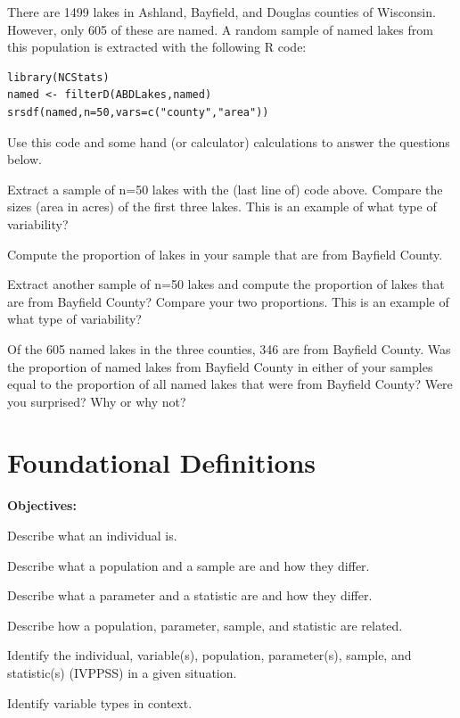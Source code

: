 \documentclass[10pt,openany]{book}\usepackage[]{graphicx}\usepackage[]{color}
\makeatletter
\newenvironment{kframe}{%
 \def\at@end@of@kframe{}%
 \ifinner\ifhmode%
  \def\at@end@of@kframe{\end{minipage}}%
  \begin{minipage}{\columnwidth}%
 \fi\fi%
 \def\FrameCommand##1{\hskip\@totalleftmargin \hskip-\fboxsep
 \colorbox{shadecolor}{##1}\hskip-\fboxsep
     \hskip-\linewidth \hskip-\@totalleftmargin \hskip\columnwidth}%
 \MakeFramed {\advance\hsize-\width
   \@totalleftmargin\z@ \linewidth\hsize
   \@setminipage}}%
 {\par\unskip\endMakeFramed%
 \at@end@of@kframe}
\newenvironment{knitrout}{}{} %
\makeatother
\begin{document}
\begin{exsection}
  \item \label{revex:WhyStatsLakes} There are 1499 lakes in Ashland, Bayfield, and Douglas counties of Wisconsin. However, only 605 of these are named. A random sample of named lakes from this population is extracted with the following R code:
\vspace{-12pt}
\begin{knitrout}
\color{fgcolor}\begin{kframe}
\begin{verbatim}
library(NCStats)
named <- filterD(ABDLakes,named)
srsdf(named,n=50,vars=c("county","area"))
\end{verbatim}
\end{kframe}
\end{knitrout}
Use this code and some hand (or calculator) calculations to answer the questions below.
\begin{Enumerate}
  \item Extract a sample of n=50 lakes with the (last line of) code above. Compare the sizes (area in acres) of the first three lakes. This is an example of what type of variability?
  \item Compute the proportion of lakes in your sample that are from Bayfield County.
  \item Extract another sample of n=50 lakes and compute the proportion of lakes that are from Bayfield County? Compare your two proportions. This is an example of what type of variability?
  \item Of the 605 named lakes in the three counties, 346 are from Bayfield County. Was the proportion of named lakes from Bayfield County in either of your samples equal to the proportion of all named lakes that were from Bayfield County?  Were you surprised?  Why or why not?
\end{Enumerate}
\end{exsection}



\chapter{Foundational Definitions} \label{chap:FoundationalDefinitions}
\begin{ChapObj}{\boxwidth}
  \textbf{Objectives:}
  \begin{Enumerate}
    \item Describe what an individual is.
    \item Describe what a population and a sample are and how they differ.
    \item Describe what a parameter and a statistic are and how they differ.
    \item Describe how a population, parameter, sample, and statistic are related.
    \item Identify the individual, variable(s), population, parameter(s), sample, and statistic(s) (IVPPSS) in a given situation.
    \item Identify variable types in context.
  \end{Enumerate}
\end{ChapObj}
\end{document}
